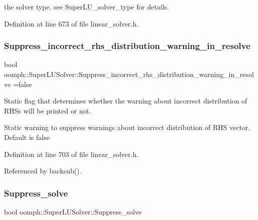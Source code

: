 the solver type. see Super\+L\+U\+\_\+solver\+\_\+type for details. 



Definition at line 673 of file linear\+\_\+solver.\+h.

\mbox{\label{classoomph_1_1SuperLUSolver_a11c89f3138e42a38eb0cd5def128eabf}} 
\subsubsection{\texorpdfstring{Suppress\+\_\+incorrect\+\_\+rhs\+\_\+distribution\+\_\+warning\+\_\+in\+\_\+resolve}{Suppress\_incorrect\_rhs\_distribution\_warning\_in\_resolve}}
{\footnotesize\ttfamily bool oomph\+::\+Super\+L\+U\+Solver\+::\+Suppress\+\_\+incorrect\+\_\+rhs\+\_\+distribution\+\_\+warning\+\_\+in\+\_\+resolve =false\hspace{0.3cm}{\ttfamily [static]}}



Static flag that determines whether the warning about incorrect distribution of R\+H\+Ss will be printed or not. 

Static warning to suppress warnings about incorrect distribution of R\+HS vector. Default is false 

Definition at line 703 of file linear\+\_\+solver.\+h.



Referenced by backsub().

\mbox{\label{classoomph_1_1SuperLUSolver_a88f9065710fb4b6096369586be76a67c}} 
\subsubsection{\texorpdfstring{Suppress\+\_\+solve}{Suppress\_solve}}
{\footnotesize\ttfamily bool oomph\+::\+Super\+L\+U\+Solver\+::\+Suppress\+\_\+solve\hspace{0.3cm}{\ttfamily [private]}}



